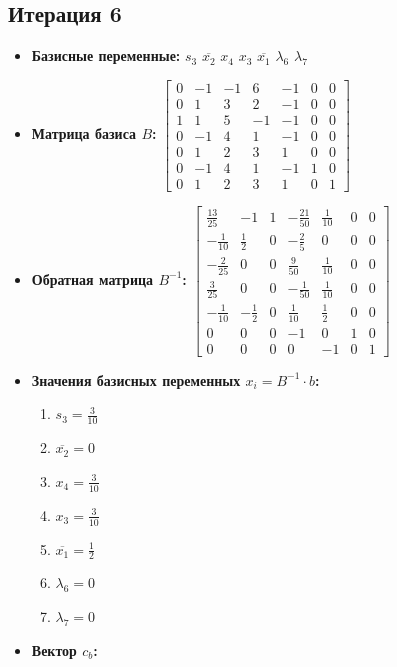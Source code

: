 \begin{itemize}
\subsection*{Итерация 6}
\begin{itemize}
\item \textbf{Базисные переменные:}
$s_3$
$\overline{x_2}$
$x_4$
$x_3$
$\overline{x_1}$
$\lambda_6$
$\lambda_7$
\item \textbf{Матрица базиса $B$:}
$\left[\begin{matrix}0 & -1 & -1 & 6 & -1 & 0 & 0\\0 & 1 & 3 & 2 & -1 & 0 & 0\\1 & 1 & 5 & -1 & -1 & 0 & 0\\0 & -1 & 4 & 1 & -1 & 0 & 0\\0 & 1 & 2 & 3 & 1 & 0 & 0\\0 & -1 & 4 & 1 & -1 & 1 & 0\\0 & 1 & 2 & 3 & 1 & 0 & 1\end{matrix}\right]$
\item \textbf{Обратная матрица $B^{-1}$:}
$\left[\begin{matrix}\frac{13}{25} & -1 & 1 & - \frac{21}{50} & \frac{1}{10} & 0 & 0\\- \frac{1}{10} & \frac{1}{2} & 0 & - \frac{2}{5} & 0 & 0 & 0\\- \frac{2}{25} & 0 & 0 & \frac{9}{50} & \frac{1}{10} & 0 & 0\\\frac{3}{25} & 0 & 0 & - \frac{1}{50} & \frac{1}{10} & 0 & 0\\- \frac{1}{10} & - \frac{1}{2} & 0 & \frac{1}{10} & \frac{1}{2} & 0 & 0\\0 & 0 & 0 & -1 & 0 & 1 & 0\\0 & 0 & 0 & 0 & -1 & 0 & 1\end{matrix}\right]$
\item \textbf{Значения базисных переменных $ x_i = B^{-1} \cdot b$:}
\begin{enumerate}
\item $s_3 = \frac{3}{10}$
\item $\overline{x_2} = 0$
\item $x_4 = \frac{3}{10}$
\item $x_3 = \frac{3}{10}$
\item $\overline{x_1} = \frac{1}{2}$
\item $\lambda_6 = 0$
\item $\lambda_7 = 0$
\end{enumerate}
\item \textbf{Вектор $c_b$:}

\end{itemize}
\end{itemize}
